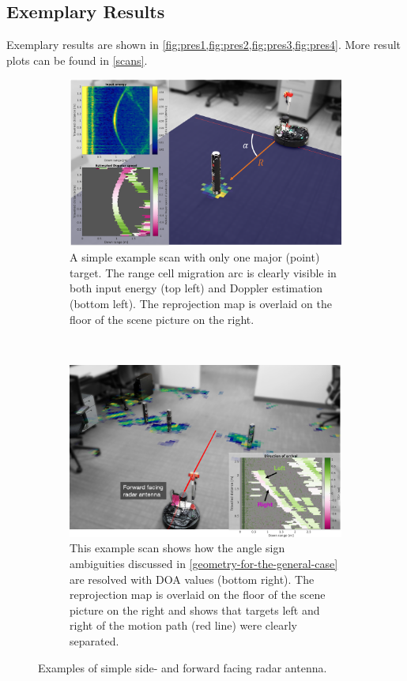 \subsection{Exemplary Results}
Exemplary results are shown in \cref{fig:pres1,fig:pres2,fig:pres3,fig:pres4}. More result plots can be found in \cref{scans}.

\begin{figure}[htbp]
    \centering
    \begin{subfigure}{.95\textwidth}
        \includegraphics[max width=\textwidth]{gfx/diagrams/presentationscan1.png}
        \caption{A simple example scan with only one major (point) target. The range cell migration arc is clearly visible in both input energy (top left) and Doppler estimation (bottom left). The reprojection map is overlaid on the floor of the scene picture on the right.}
        \label{fig:pres1}
    \end{subfigure}\medskip\\
    \begin{subfigure}{.95\textwidth}
        \includegraphics[max width=\textwidth]{gfx/diagrams/presentationscan_2.png}
        \caption{This example scan shows how the angle sign ambiguities discussed in \cref{geometry-for-the-general-case} are resolved with DOA values (bottom right). The reprojection map is overlaid on the floor of the scene picture on the right and shows that targets left and right of the motion path (red line) were clearly separated.}
        \label{fig:pres2}
    \end{subfigure}
    \caption{Examples of simple side- and forward facing radar antenna.}
\end{figure}


